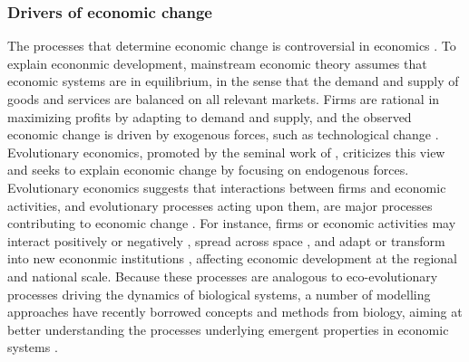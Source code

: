 \subsubsection*{Drivers of economic change}
The processes that determine economic change is controversial in economics \cite{Nelson2014}. 
To explain econonmic development, mainstream economic theory assumes that economic systems are in equilibrium, in the sense that the demand and supply of goods and services are balanced on all relevant markets. Firms are rational in maximizing profits by adapting to demand and supply, and the observed economic change is driven by exogenous forces, such as technological change \cite{Romer1986}. Evolutionary economics, promoted by the seminal work of \cite{Nelson2014}, criticizes this view and seeks to explain economic change by focusing on endogenous forces. 
% 
Evolutionary economics suggests that interactions between firms and economic activities, and evolutionary processes acting upon them, are major processes contributing to economic change \cite{Hodgson2019}.
% 
For instance, firms or economic activities may interact positively or negatively \cite{Wernerfelt1989,Pistorius2007Ozman2009,Saavedra2009a,Cohendet2018,Menon2015}, spread across space \cite{RogersEverettM2003DoI,Zahra2000}, and adapt \cite{Cordes2006} or transform into new econonmic institutions  \cite{Freeman2002,Hodgson2004,Aldrich2008}, affecting economic development at the regional and national scale.
%
% 
% 
Because these processes are analogous to eco-evolutionary processes driving the dynamics of biological systems, a number of modelling approaches have recently borrowed concepts and methods from biology, aiming at better understanding the processes underlying emergent properties in economic systems \cite{Tacchella2018,Saavedra2009a,Scholl2020,Zhang2018,Modis1997,Saavedra2014,Farmer1999,Michalakelis2011,Marasco2016,Gatabazi2019,Cauwels56,Applegate2021,Suweis2015}. 
